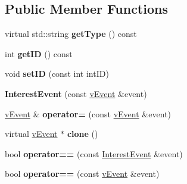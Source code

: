 \subsection*{Public Member Functions}
\begin{DoxyCompactItemize}
\item 
virtual std\+::string {\bfseries get\+Type} () const \hypertarget{classev_1_1InterestEvent_a63fdfcabfca0ecf0554eccb1eadda751}{}\label{classev_1_1InterestEvent_a63fdfcabfca0ecf0554eccb1eadda751}

\item 
int {\bfseries get\+ID} () const \hypertarget{classev_1_1InterestEvent_a045f85bd13470efe93904275a9da5c1b}{}\label{classev_1_1InterestEvent_a045f85bd13470efe93904275a9da5c1b}

\item 
void {\bfseries set\+ID} (const int int\+ID)\hypertarget{classev_1_1InterestEvent_acbb2eb34db2594d80b9aade51eb9ff7b}{}\label{classev_1_1InterestEvent_acbb2eb34db2594d80b9aade51eb9ff7b}

\item 
{\bfseries Interest\+Event} (const \hyperlink{classev_1_1vEvent}{v\+Event} \&event)\hypertarget{classev_1_1InterestEvent_a660a459a68d4d7d86436a6af0fdb98c6}{}\label{classev_1_1InterestEvent_a660a459a68d4d7d86436a6af0fdb98c6}

\item 
\hyperlink{classev_1_1vEvent}{v\+Event} \& {\bfseries operator=} (const \hyperlink{classev_1_1vEvent}{v\+Event} \&event)\hypertarget{classev_1_1InterestEvent_a3194622867f847b78867035595a23eb2}{}\label{classev_1_1InterestEvent_a3194622867f847b78867035595a23eb2}

\item 
virtual \hyperlink{classev_1_1vEvent}{v\+Event} $\ast$ {\bfseries clone} ()\hypertarget{classev_1_1InterestEvent_aad82d9299e6cc1fadd86c2620e97b7cd}{}\label{classev_1_1InterestEvent_aad82d9299e6cc1fadd86c2620e97b7cd}

\item 
bool {\bfseries operator==} (const \hyperlink{classev_1_1InterestEvent}{Interest\+Event} \&event)\hypertarget{classev_1_1InterestEvent_ace17bdbe6bfd2e1ca5ed9a9a9ea0fab0}{}\label{classev_1_1InterestEvent_ace17bdbe6bfd2e1ca5ed9a9a9ea0fab0}

\item 
bool {\bfseries operator==} (const \hyperlink{classev_1_1vEvent}{v\+Event} \&event)\hypertarget{classev_1_1InterestEvent_ab88e5cfcb71a211216f295b67db7ecdc}{}\label{classev_1_1InterestEvent_ab88e5cfcb71a211216f295b67db7ecdc}


\end{DoxyCompactItemize}
